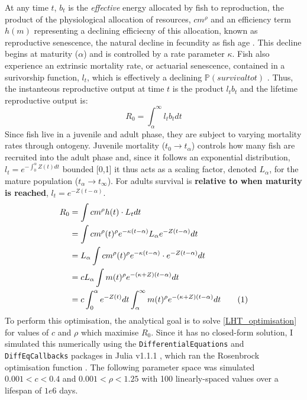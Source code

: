 \documentclass[a4paper]{article} %
\newcommand\numberthis{\addtocounter{equation}{1}\tag{\theequation}}
\begin{document}
At any time $t$, $b_{t}$ is the \textit{effective} energy allocated by fish to reproduction, the product of the physiological allocation of resources, $cm^{\rho}$ and an efficiency term $h(m)$ representing a declining efficiecny of this allocation, known as reproductive senescence, the natural decline in fecundity as fish age \autocite{Stearns2000, Benoit2018, Vrtilek2018}. This decline begins at maturity ($\alpha$) and is controlled by a rate parameter $\kappa$. Fish also experience an extrinsic mortality rate, or actuarial senescence, contained in a surivorship function, $l_t$, which is effectively a declining $\mathbb{P}(survival to t)$ \autocite{Charnov1993, Charnov2001, Benoit2018, Laird2010, Reznick2002, Reznick2006}. Thus, the instanteous reproductive output at time $t$ is the product $l_{t}b_{t}$ and the lifetime reproductive output is:
\begin{equation}
    R_{0} = \int_{\alpha}^{\infty}l_{t}b_{t} dt
\end{equation}
Since fish live in a juvenile and adult phase, they are subject to varying mortality rates through ontogeny. Juvenile mortality ($t_0 \rightarrow t_{\alpha}$) controls how many fish are recruited into the adult phase and, since it follows an exponential distribution, $l_t = e^{-\int_{0}^{\alpha}Z(t)dt}$ bounded [0,1] it thus acts as a scaling factor, denoted $L_{\alpha}$, for the mature population ($t_{\alpha} \rightarrow t_{\infty}$). For adults survival is \textbf{relative to when maturity is reached}, $l_{t} = e^{-Z(t-\alpha)}$.
\begin{align*}
    R_{0} &= \int cm^{\rho}h(t) \cdot L_{t} dt \\
          &= \int cm^{\rho}(t)^{\rho} e^{-\kappa(t-\alpha)} L_{\alpha}e^{-Z(t-\alpha)} dt \\
          &= L_{\alpha}\int cm^{\rho}(t)^{\rho} e^{-\kappa(t-\alpha)} \cdot e^{-Z(t-\alpha)} dt \\
          &= cL_{\alpha}\int m(t)^{\rho} e^{-(\kappa+Z)(t-\alpha)} dt \\
          &= c\int_{0}^{\alpha}e^{-Z(t)}dt\int_{\alpha}^{\infty} m(t)^{\rho} e^{-(\kappa+Z)(t-\alpha)} dt \numberthis \label{LHT_optimisation}
\end{align*}
To perform this optimisation, the analytical goal is to solve \eqref{LHT_optimisation} for values of $c$ and $\rho$ which maximise $R_0$. Since it has no closed-form solution, I simulated this numerically using the \texttt{DifferentialEquations} and \texttt{DiffEqCallbacks} packages in Julia v1.1.1 \autocite{Bezanson2017}, which ran the Rosenbrock optimisation function \autocite{Rosenbrock1960}. The following parameter space was simulated $0.001 < c < 0.4$ and $0.001 < \rho < 1.25$ with 100 linearly-spaced values over a lifespan of $1e6$ days.
\end{document}
